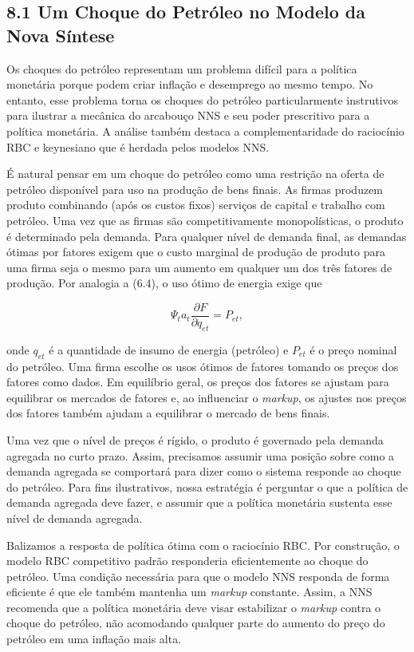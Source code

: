 \documentclass[12pt]{article}
\begin{document}
\subsection{8.1 Um Choque do Petróleo no Modelo da Nova Síntese}

Os choques do petróleo representam um problema difícil para a política monetária porque podem criar inflação e desemprego ao mesmo tempo. No entanto, esse problema torna os choques do petróleo particularmente instrutivos para ilustrar a mecânica do arcabouço NNS e seu poder prescritivo para a política monetária. A análise também destaca a complementaridade do raciocínio RBC e keynesiano que é herdada pelos modelos NNS.

É natural pensar em um choque do petróleo como uma restrição na oferta de petróleo disponível para uso na produção de bens finais. As firmas produzem produto combinando (após os custos fixos) serviços de capital e trabalho com petróleo. Uma vez que as firmas são competitivamente monopolísticas, o produto é determinado pela demanda. Para qualquer nível de demanda final, as demandas ótimas por fatores exigem que o custo marginal de produção de produto para uma firma seja o mesmo para um aumento em qualquer um dos três fatores de produção. Por analogia a (6.4), o uso ótimo de energia exige que

\begin{equation}
\Psi_t a_t \frac{\partial F}{\partial q_{et}} = P_{et},
\end{equation}

onde $q_{et}$ é a quantidade de insumo de energia (petróleo) e $P_{et}$ é o preço nominal do petróleo. Uma firma escolhe os usos ótimos de fatores tomando os preços dos fatores como dados. Em equilíbrio geral, os preços dos fatores se ajustam para equilibrar os mercados de fatores e, ao influenciar o \textit{markup}, os ajustes nos preços dos fatores também ajudam a equilibrar o mercado de bens finais.

Uma vez que o nível de preços é rígido, o produto é governado pela demanda agregada no curto prazo. Assim, precisamos assumir uma posição sobre como a demanda agregada se comportará para dizer como o sistema responde ao choque do petróleo. Para fins ilustrativos, nossa estratégia é perguntar o que a política de demanda agregada deve fazer, e assumir que a política monetária sustenta esse nível de demanda agregada.

Balizamos a resposta de política ótima com o raciocínio RBC. Por construção, o modelo RBC competitivo padrão responderia eficientemente ao choque do petróleo. Uma condição necessária para que o modelo NNS responda de forma eficiente é que ele também mantenha um \textit{markup} constante. Assim, a NNS recomenda que a política monetária deve visar estabilizar o \textit{markup} contra o choque do petróleo, não acomodando qualquer parte do aumento do preço do petróleo em uma inflação mais alta.
\end{document}
